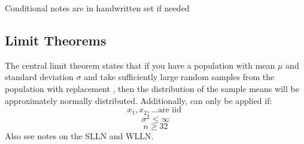 \documentclass[11pt]{article}
\begin{document}
Conditional notes are in handwritten set if needed 

\subsection*{Limit Theorems}
The central limit theorem states that if you have a population with mean $\mu$ and standard deviation $\sigma$ and take sufficiently large random samples from the population with replacement , then the distribution of the sample means will be approximately normally distributed. Additionally, can only be applied if: 
$$x_1, x_2, ... \text{are iid } $$ 
$$\sigma^2 \le \infty$$
$$ n \geq 32 $$ 
Also see notes on the SLLN and WLLN. 
\end{document}

